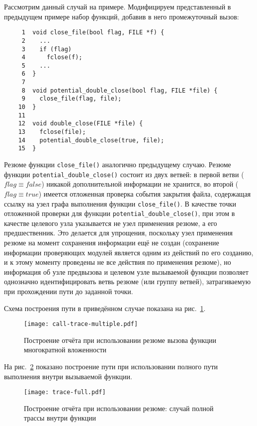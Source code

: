 Рассмотрим данный случай на примере. Модифицируем представленный в предыдущем примере набор функций, добавив в него промежуточный вызов:

\begin{verbatim}
     1  void close_file(bool flag, FILE *f) {
     2    ...
     3    if (flag)
     4      fclose(f);
     5    ...
     6  }
     7
     8  void potential_double_close(bool flag, FILE *file) {
     9    close_file(flag, file);
    10  }
    11
    12  void double_close(FILE *file) {
    13    fclose(file);
    14    potential_double_close(true, file);
    15  }
\end{verbatim}

Резюме функции \texttt{close\_file()} аналогично предыдущему случаю. Резюме функции \texttt{potential\_double\_close()} состоит из двух ветвей: в первой ветви ($flag \equiv false$) никакой дополнительной информации не хранится, во второй ($flag \equiv true$) имеется отложенная проверка события закрытия файла, содержащая ссылку на узел  графа выполнения функции \texttt{close\_file()}. В качестве точки отложенной проверки для функции \texttt{potential\_double\_close()}, при этом в качестве целевого узла указывается не узел применения резюме, а его предшественник. Это делается для упрощения, поскольку узел применения резюме на момент сохранения информации ещё не создан (сохранение информации проверяющих модулей является одним из действий по его созданию, и к этому моменту проведены не все действия по применения резюме), но информация об узле предвызова и целевом узле вызываемой функции позволяет однозначно идентифицировать ветвь резюме (или группу ветвей), затрагиваемую при прохождении пути до заданной точки.

Схема построения пути в приведённом случае показана на рис.~\ref{pic:call-trace-multiple}.

\begin{figure}
   \centering
   \texttt{[image: call-trace-multiple.pdf]}
   \caption{Построение отчёта при использовании резюме вызова функции многократной вложенности}\label{pic:call-trace-multiple}
\end{figure}


На рис.~\ref{pic:trace-full} показано построение пути при использовании полного пути выполнения внутри вызываемой функции.

\begin{figure}
   \centering
   \texttt{[image: trace-full.pdf]}
   \caption{Построение отчёта при использовании резюме: случай полной трассы внутри функции}\label{pic:trace-full}
\end{figure}


